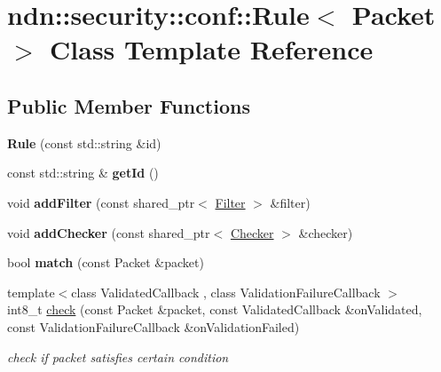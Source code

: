 \hypertarget{classndn_1_1security_1_1conf_1_1Rule}{}\section{ndn\+:\+:security\+:\+:conf\+:\+:Rule$<$ Packet $>$ Class Template Reference}
\label{classndn_1_1security_1_1conf_1_1Rule}
\subsection*{Public Member Functions}
\begin{DoxyCompactItemize}
\item 
{\bfseries Rule} (const std\+::string \&id)\hypertarget{classndn_1_1security_1_1conf_1_1Rule_ad1162c456616073490ad87da8dbed105}{}\label{classndn_1_1security_1_1conf_1_1Rule_ad1162c456616073490ad87da8dbed105}

\item 
const std\+::string \& {\bfseries get\+Id} ()\hypertarget{classndn_1_1security_1_1conf_1_1Rule_a1d802299a5cfcc85d604739d03db3b38}{}\label{classndn_1_1security_1_1conf_1_1Rule_a1d802299a5cfcc85d604739d03db3b38}

\item 
void {\bfseries add\+Filter} (const shared\+\_\+ptr$<$ \hyperlink{classndn_1_1security_1_1conf_1_1Filter}{Filter} $>$ \&filter)\hypertarget{classndn_1_1security_1_1conf_1_1Rule_aa030ea72111d433c8333928b8bf5a804}{}\label{classndn_1_1security_1_1conf_1_1Rule_aa030ea72111d433c8333928b8bf5a804}

\item 
void {\bfseries add\+Checker} (const shared\+\_\+ptr$<$ \hyperlink{classndn_1_1security_1_1conf_1_1Checker}{Checker} $>$ \&checker)\hypertarget{classndn_1_1security_1_1conf_1_1Rule_a16ed2ec45055d87572266e09ed5d42e8}{}\label{classndn_1_1security_1_1conf_1_1Rule_a16ed2ec45055d87572266e09ed5d42e8}

\item 
bool {\bfseries match} (const Packet \&packet)\hypertarget{classndn_1_1security_1_1conf_1_1Rule_aaa51c933de17d54085a974b0af939b32}{}\label{classndn_1_1security_1_1conf_1_1Rule_aaa51c933de17d54085a974b0af939b32}

\item 
{\footnotesize template$<$class Validated\+Callback , class Validation\+Failure\+Callback $>$ }\\int8\+\_\+t \hyperlink{classndn_1_1security_1_1conf_1_1Rule_a24c3c8d6426b0942b961188f68782433}{check} (const Packet \&packet, const Validated\+Callback \&on\+Validated, const Validation\+Failure\+Callback \&on\+Validation\+Failed)
\begin{DoxyCompactList}\small\item\em check if packet satisfies certain condition \end{DoxyCompactList}\end{DoxyCompactItemize}


